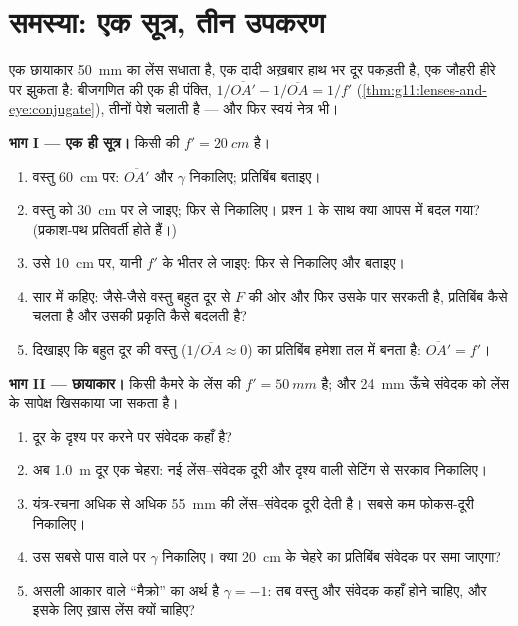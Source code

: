 \section{समस्या: एक सूत्र, तीन उपकरण}

\begin{problem}
\label{pb:g11:lenses-and-eye:1}
एक छायाकार \qty{50}{mm} का लेंस सधाता है, एक दादी अख़बार हाथ भर दूर
पकड़ती है, एक जौहरी हीरे पर झुकता है: बीजगणित की एक ही पंक्ति, $1/\overline{OA'} - 1/\overline{OA} = 1/f'$
(\cref{thm:g11:lenses-and-eye:conjugate}), तीनों पेशे चलाती है --- और फिर स्वयं नेत्र भी।

\medskip
\noindent\textbf{भाग I --- एक ही सूत्र।} किसी  की
$f' = \qty{20}{cm}$ है।
\begin{enumerate}
  \item वस्तु \qty{60}{cm} पर: $\overline{OA'}$ और $\gamma$ निकालिए; प्रतिबिंब बताइए।
  \item वस्तु को \qty{30}{cm} पर ले जाइए; फिर से निकालिए। प्रश्न 1 के साथ
        क्या आपस में बदल गया? (प्रकाश-पथ प्रतिवर्ती होते हैं।)
  \item उसे \qty{10}{cm} पर, यानी $f'$ के भीतर ले जाइए: फिर से निकालिए और
        बताइए।
  \item सार में कहिए: जैसे-जैसे वस्तु बहुत दूर से $F$ की ओर और फिर
        उसके पार सरकती है, प्रतिबिंब कैसे चलता है और उसकी प्रकृति कैसे
        बदलती है?
  \item दिखाइए कि बहुत दूर की वस्तु ($1/\overline{OA} \approx 0$) का प्रतिबिंब हमेशा 
        तल में बनता है: $\overline{OA'} = f'$।
\end{enumerate}

\medskip
\noindent\textbf{भाग II --- छायाकार।}
किसी कैमरे के लेंस की $f' = \qty{50}{mm}$ है; और \qty{24}{mm} ऊँचे संवेदक को
लेंस के सापेक्ष खिसकाया जा सकता है।
\begin{enumerate}[resume]
  \item दूर के दृश्य पर  करने पर संवेदक कहाँ है?
  \item अब \qty{1.0}{m} दूर एक चेहरा: नई लेंस--संवेदक दूरी और दृश्य वाली
        सेटिंग से सरकाव निकालिए।
  \item यंत्र-रचना अधिक से अधिक \qty{55}{mm} की लेंस--संवेदक दूरी देती है।
        सबसे कम फोकस-दूरी निकालिए।
  \item उस सबसे पास वाले  पर $\gamma$ निकालिए। क्या \qty{20}{cm} के चेहरे
        का प्रतिबिंब संवेदक पर समा जाएगा?
  \item असली आकार वाले ``मैक्रो'' का अर्थ है $\gamma = -1$: तब वस्तु और संवेदक
        कहाँ होने चाहिए, और इसके लिए ख़ास लेंस क्यों चाहिए?
\end{enumerate}


\end{problem}
